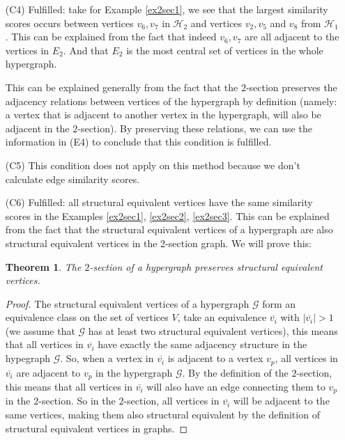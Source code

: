 \documentclass[a4paper,11pt]{report}
\newtheorem{theorem}{Theorem}[section]
\newcommand{\hgraf}{\mathcal{G}}
\newcommand{\hgrafeen}{\mathcal{H}}
\begin{document}
\begin{itemize}
  \item[(C4)] Fulfilled: take for Example \ref{ex2sec1}, we see that the largest similarity scores
  occurs between vertices $v_6, v_7$ 
  in $\hgrafeen_2$ and vertices $v_2, v_5$ and $v_8$ from $\hgrafeen_1$. This can 
  be explained from the fact that indeed $v_6,v_7$ are all adjacent to the vertices in $E_2$. And that $E_2$ is the 
  most central set of vertices in the whole hypergraph. 
  
  This can be explained 
  generally from the fact that the 2-section preserves the adjacency relations between 
  vertices of the hypergraph by definition (namely: a vertex that is adjacent to another vertex in the hypergraph, will also be adjacent in the $2$-section). By preserving these relations, we can 
  use the information in (E4) to conclude that this condition is fulfilled.
    \item[(C5)] This condition does not apply on this method because we don't calculate edge similarity scores.
   \item[(C6)] Fulfilled: all structural equivalent vertices have the same similarity 
   scores in the Examples \ref{ex2sec1}, \ref{ex2sec2}, \ref{ex2sec3}. This can be explained
   from the fact that the structural equivalent vertices of a hypergraph are also 
   structural equivalent vertices in the 2-section graph. We will prove this:
   
    \begin{theorem}
   The $2$-section of a hypergraph preserves structural equivalent vertices. \end{theorem}
 \begin{proof}
   The structural equivalent vertices of a hypergraph $\hgraf$ form an equivalence class on the set of vertices
   $V$, take an equivalence $\overline{v_i}$ with $|\overline{v_i}| > 1$ (we assume that $\hgraf$ has at least two structural equivalent vertices),
   this means that all vertices in $\overline{v_i}$ have exactly the same adjacency structure in the hypegraph $\hgraf$.  
   So, when a vertex in $\overline{v_i}$ is adjacent to a vertex $v_p$, all 
   vertices in $\overline{v_i}$ are adjacent to $v_p$ in the hypergraph 
   $\hgraf$. By the definition of the $2$-section, this means that all vertices 
   in $\overline{v_i}$ will also have an edge connecting them to $v_p$ in the 
   $2$-section. So in the $2$-section, all vertices in $\overline{v_i}$ will be adjacent to 
  the same vertices, making them also structural equivalent by the definition of structural equivalent vertices in graphs.   
   

\end{proof}
\end{itemize}
\end{document}
